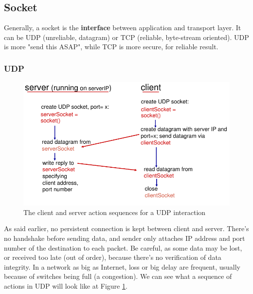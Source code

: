 \documentclass[12pt,a4paper]{article}
\begin{document}
\subsection{Socket}
Generally, a socket is the \textbf{interface} between application and transport layer. It can be UDP (unreliable, datagram) or TCP (reliable, byte-stream oriented). UDP is more "send this ASAP", while TCP is more secure, for reliable result.

\subsubsection{UDP}
\begin{figure}[!h]
	\centering
	\includegraphics[scale=0.5]{images/udp_sequence}
	\caption{The client and server action sequences for a UDP interaction}
	\label{fig: udp_sequence}
\end{figure}
As said earlier, no persistent connection is kept between client and server. There's no handshake before sending data, and sender only attaches IP address and port number of the destination to each packet. Be careful, as some data may be lost, or received too late (out of order), because there's no verification of data integrity. In a network as big as Internet, loss or big delay are frequent, usually because of switches being full (a congestion). We can see what a sequence of actions in UDP will look like at Figure \ref{fig: udp_sequence}.
\newpage
\end{document}
